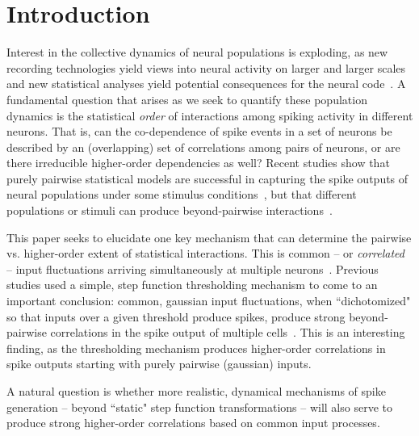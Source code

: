 \documentclass[%
 reprint,
 twocolumn,
 amsmath,amssymb,
 aps,
floatfix,
]{revtex4}
\begin{document}
\section{\label{sec:intro}Introduction}%

Interest in the collective dynamics of neural populations is exploding, as new recording technologies yield views into neural activity on larger and larger scales~\cite{shlens, another review} and new statistical  analyses yield potential consequences for the neural code~\cite{pillow,ganmor,kass review,joel review}.  A fundamental question that arises as we seek to quantify these population dynamics is the statistical {\it order} of interactions among spiking activity in different neurons.  That is, can the co-dependence of spike events in a set of neurons be described by an (overlapping) set of correlations among pairs of neurons, or are there irreducible higher-order dependencies as well?  Recent studies show that purely pairwise statistical models are successful in capturing the spike outputs of neural populations under some stimulus conditions~\cite{schneidman06,shlens06,shlens09}, but that different populations or stimuli can produce beyond-pairwise interactions~\cite{victor,ganmor,montani,yu}.

This paper seeks to elucidate one key mechanism that can determine the pairwise vs. higher-order extent of statistical interactions.  This is common -- or {\it correlated} -- input fluctuations arriving simultaneously at multiple neurons~\cite{shadnew08,binpowers,tr08}.  Previous studies used a simple, step function thresholding mechanism to come to an important conclusion:  common, gaussian input fluctuations, when ``dichotomized" so that inputs over a given threshold produce spikes, produce strong beyond-pairwise correlations in the spike output of multiple cells~\cite{macke11,Amarietal03}.  This is an interesting finding, as the thresholding mechanism produces higher-order correlations in spike outputs starting with purely pairwise (gaussian) inputs.  

A natural question is whether more realistic, dynamical mechanisms of spike generation -- beyond ``static" step function transformations -- will also serve to produce strong higher-order correlations based on common input processes.  

\end{document}
